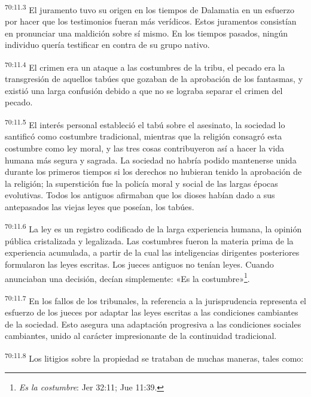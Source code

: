 \par
\textsuperscript{70:11.3} El juramento tuvo su origen en los tiempos de Dalamatia en un esfuerzo por hacer que los testimonios fueran más verídicos. Estos juramentos consistían en pronunciar una maldición sobre sí mismo. En los tiempos pasados, ningún individuo quería testificar en contra de su grupo nativo.

\par
\textsuperscript{70:11.4} El crimen era un ataque a las costumbres de la tribu, el pecado era la transgresión de aquellos tabúes que gozaban de la aprobación de los fantasmas, y existió una larga confusión debido a que no se lograba separar el crimen del pecado.

\par
\textsuperscript{70:11.5} El interés personal estableció el tabú sobre el asesinato, la sociedad lo santificó como costumbre tradicional, mientras que la religión consagró esta costumbre como ley moral, y las tres cosas contribuyeron así a hacer la vida humana más segura y sagrada. La sociedad no habría podido mantenerse unida durante los primeros tiempos si los derechos no hubieran tenido la aprobación de la religión; la superstición fue la policía moral y social de las largas épocas evolutivas. Todos los antiguos afirmaban que los dioses habían dado a sus antepasados las viejas leyes que poseían, los tabúes.

\par
\textsuperscript{70:11.6} La ley es un registro codificado de la larga experiencia humana, la opinión pública cristalizada y legalizada. Las costumbres fueron la materia prima de la experiencia acumulada, a partir de la cual las inteligencias dirigentes posteriores formularon las leyes escritas. Los jueces antiguos no tenían leyes. Cuando anunciaban una decisión, decían simplemente: «Es la costumbre»\footnote{\textit{Es la costumbre}: Jer 32:11; Jue 11:39.}.

\par
\textsuperscript{70:11.7} En los fallos de los tribunales, la referencia a la jurisprudencia representa el esfuerzo de los jueces por adaptar las leyes escritas a las condiciones cambiantes de la sociedad. Esto asegura una adaptación progresiva a las condiciones sociales cambiantes, unido al carácter impresionante de la continuidad tradicional.

\par
\textsuperscript{70:11.8} Los litigios sobre la propiedad se trataban de muchas maneras, tales como:

